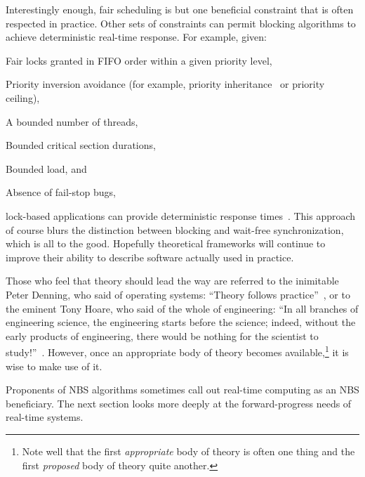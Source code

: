 Interestingly enough, fair scheduling is but one beneficial
constraint that is often respected in practice.
Other sets of constraints can permit blocking algorithms to
achieve deterministic real-time response.
For example, given:
\begin{enumerate*}[(1)]
\item Fair locks granted in FIFO order within a given priority level,
\item Priority inversion avoidance (for example, priority
inheritance~\cite{Takada:1995:RSN:527074.828566,Cai-DongWang1996PrioInherLock}
or priority ceiling),
\item A bounded number of threads,
\item Bounded critical section durations,
\item Bounded load,
and
\item Absence of fail-stop bugs,
\end{enumerate*}
lock-based applications can provide deterministic
response times~\cite{BjoernBrandenburgPhD,DipankarSarma2004OLSscalability}.
This approach of course blurs the distinction between blocking and wait-free
synchronization, which is all to the good.
Hopefully theoretical frameworks will continue to improve their ability
to describe software actually used in practice.

Those who feel that theory should lead the way are referred to the
inimitable Peter Denning, who said of operating systems:
``Theory follows practice''~\cite{Denning:2015:POF:2830903.2830904},
or to the eminent Tony Hoare, who said of the whole of engineering:
``In all branches of engineering science, the engineering starts before
the science; indeed, without the early products of engineering, there
would be nothing for the scientist to
study!''~\cite{RichardMorris2007TonyHoareInterview}.
However, once an appropriate body of theory becomes available,\footnote{
	Note well that the first \emph{appropriate} body of theory is often one
	thing and the first \emph{proposed} body of theory quite another.}
it is wise to make use of it.

Proponents of NBS algorithms sometimes call out real-time computing as
an NBS beneficiary.
The next section looks more deeply at the forward-progress needs of
real-time systems.



